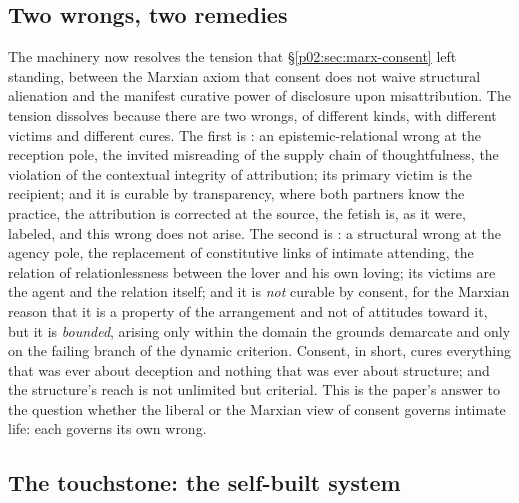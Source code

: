 \subsection{Two wrongs, two remedies}
\label{p02:sec:synthesis-twowrongs}

The machinery now resolves the tension that \S\ref{p02:sec:marx-consent} left standing, between the Marxian axiom that consent does not waive structural alienation and the manifest curative power of disclosure upon misattribution. The tension dissolves because there are two wrongs, of different kinds, with different victims and different cures. The first is : an epistemic-relational wrong at the reception pole, the invited misreading of the supply chain of thoughtfulness, the violation of the contextual integrity of attribution; its primary victim is the recipient; and it is curable by transparency, where both partners know the practice, the attribution is corrected at the source, the fetish is, as it were, labeled, and this wrong does not arise. The second is : a structural wrong at the agency pole, the replacement of constitutive links of intimate attending, the relation of relationlessness between the lover and his own loving; its victims are the agent and the relation itself; and it is \emph{not} curable by consent, for the Marxian reason that it is a property of the arrangement and not of attitudes toward it, but it is \emph{bounded}, arising only within the domain the grounds demarcate and only on the failing branch of the dynamic criterion. Consent, in short, cures everything that was ever about deception and nothing that was ever about structure; and the structure's reach is not unlimited but criterial. This is the paper's answer to the question whether the liberal or the Marxian view of consent governs intimate life: each governs its own wrong.

\subsection{The touchstone: the self-built system}
\label{p02:sec:synthesis-touchstone}

